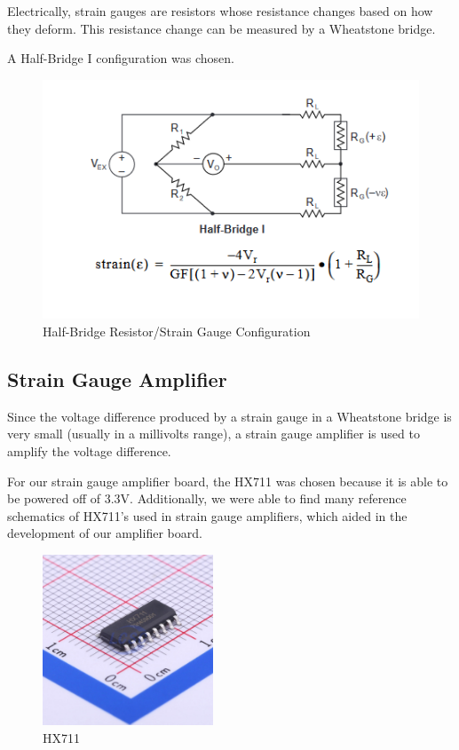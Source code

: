 Electrically, strain gauges are resistors whose resistance changes based on how they deform.
This resistance change can be measured by a Wheatstone bridge.
\vspace{1em}

A Half-Bridge I configuration was chosen.
\begin{figure}[H]
    \centering
    \includegraphics[width=5in]{images/calculating strain.png}
    \caption{Half-Bridge Resistor/Strain Gauge Configuration}
    \label{fig:hbi}
\end{figure}

\subsection{Strain Gauge Amplifier}
Since the voltage difference produced by a strain gauge in a Wheatstone bridge is very small (usually in a millivolts range), a strain gauge amplifier is used to amplify the voltage difference.
\vspace{1em}

For our strain gauge amplifier board, the HX711 was chosen because it is able to be powered off of 3.3V.
Additionally, we were able to find many reference schematics of HX711's used in strain gauge amplifiers, which aided in the development of our amplifier board.
\begin{figure}[H]
    \centering
    \includegraphics[width=2in]{images/hx711.jpg}
    \caption{HX711}
    \label{fig:hx711-pic}
\end{figure}

